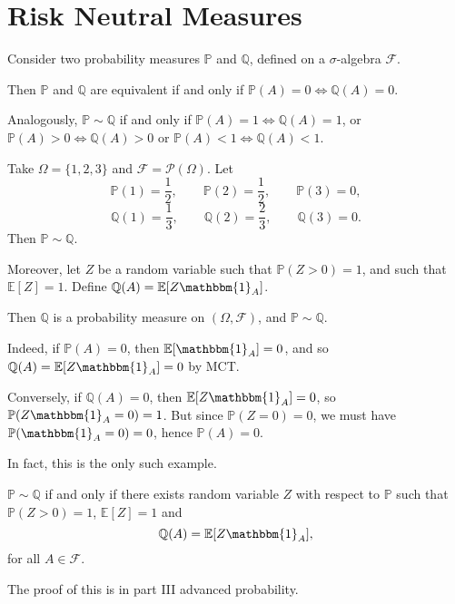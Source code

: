 \documentclass[12pt]{article}
\begin{document}
\newpage

\section{Risk Neutral Measures}
\label{sec:risk_0}

\begin{definition}
	Consider two probability measures $\mathbb{P}$ and $\mathbb{Q}$, defined on a $\sigma$-algebra $\mathcal{F}$.

	Then $\mathbb{P}$ and $\mathbb{Q}$ are equivalent if and only if $\mathbb{P}(A) = 0 \iff \mathbb{Q}(A) = 0$.
\end{definition}

\begin{remark}
 	Analogously, $\mathbb{P} \sim \mathbb{Q}$ if and only if $\mathbb{P}(A) = 1 \iff \mathbb{Q}(A) = 1$, or $\mathbb{P}(A) > 0 \iff \mathbb{Q}(A) > 0$ or $\mathbb{P}(A) < 1 \iff \mathbb{Q}(A) < 1$.
\end{remark}

\begin{exbox}
	Take $\Omega = \{1, 2, 3\}$ and $\mathcal{F} = \mathcal{P}(\Omega)$. Let
	\[
	\mathbb{P}(1) = \frac{1}{2}, \qquad \mathbb{P}(2) = \frac{1}{2}, \qquad \mathbb{P}(3) = 0,
	\]
	\[
	\mathbb{Q}(1) = \frac{1}{3}, \qquad \mathbb{Q}(2) = \frac{2}{3}, \qquad \mathbb{Q}(3) = 0.
	\]
	Then $\mathbb{P} \sim \mathbb{Q}$.

	Moreover, let $Z$ be a random variable such that $\mathbb{P}(Z > 0) = 1$, and such that $\mathbb{E}[Z] = 1$. Define $\mathbb{Q}(A) = \mathbb{E}[Z \mathbbm{1}_{A}]$.

	Then $\mathbb{Q}$ is a probability measure on $(\Omega, \mathcal{F})$, and $\mathbb{P} \sim \mathbb{Q}$.

	Indeed, if  $\mathbb{P}(A) = 0$, then $\mathbb{E}[\mathbbm{1}_{A}] = 0$, and so $\mathbb{Q}(A) = \mathbb{E}[Z \mathbbm{1}_{A}] = 0$ by MCT.

	Conversely, if $\mathbb{Q}(A) = 0$, then $\mathbb{E}[Z \mathbbm{1}_{A}] = 0$, so $\mathbb{P}(Z \mathbbm{1}_{A} = 0) = 1$. But since $\mathbb{P}(Z = 0) = 0$, we must have $\mathbb{P}(\mathbbm{1}_{A} = 0) = 0$, hence $\mathbb{P}(A) = 0$.
\end{exbox}

In fact, this is the only such example.

\begin{theorem}
	$\mathbb{P} \sim \mathbb{Q}$ if and only if there exists random variable $Z$ with respect to $\mathbb{P}$ such that $\mathbb{P}(Z > 0) = 1$, $\mathbb{E}[Z] = 1$ and
	\[
	\mathbb{Q}(A) = \mathbb{E}[Z \mathbbm{1}_{A}],
	\]
	for all $A \in \mathcal{F}$.
\end{theorem}
The proof of this is in part III advanced probability.
\end{document}
